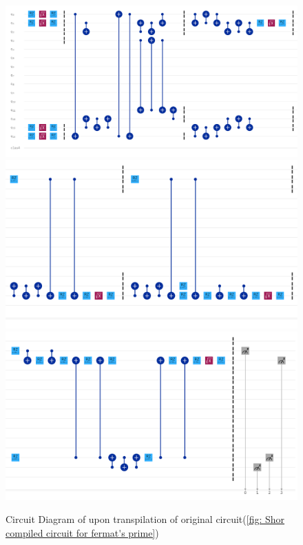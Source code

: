 \begin{figure}[p]
    \centering
    \includegraphics[width = 0.9\linewidth]{figures/transpiled_i.png}
    \includegraphics[width = 0.9\linewidth]{figures/transpiled_ii.png}
    \includegraphics[width = 0.9\linewidth]{figures/transpiled_iii.png}
  \caption{Circuit Diagram of upon transpilation of original circuit(\ref{fig: Shor compiled circuit for fermat's prime})}
  \label{fig: Transpiled circuit diagram}
\end{figure}

